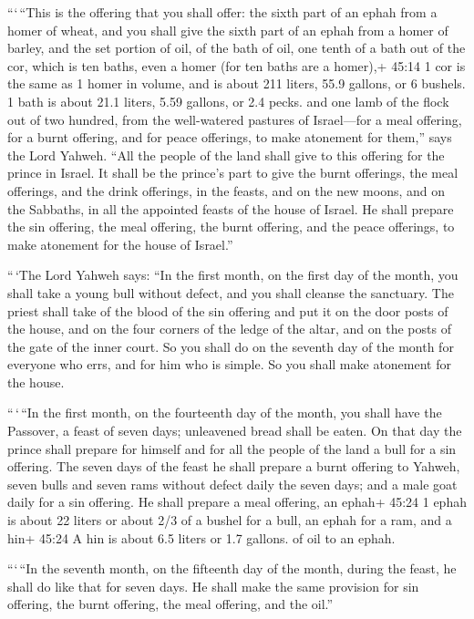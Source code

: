  ```\,``This is the offering that you shall offer: the
sixth part of an ephah from a homer of wheat, and you shall give the
sixth part of an ephah from a homer of barley,  and the set
portion of oil, of the bath of oil, one tenth of a bath out of the cor,
which is ten baths, even a homer (for ten baths are a homer),+ 45:14 1
cor is the same as 1 homer in volume, and is about 211 liters, 55.9
gallons, or 6 bushels. 1 bath is about 21.1 liters, 5.59 gallons, or 2.4
pecks.  and one lamb of the flock out of two hundred, from
the well-watered pastures of Israel---for a meal offering, for a burnt
offering, and for peace offerings, to make atonement for them,'' says
the Lord Yahweh.  ``All the people of the land shall give
to this offering for the prince in Israel.  It shall be the
prince's part to give the burnt offerings, the meal offerings, and the
drink offerings, in the feasts, and on the new moons, and on the
Sabbaths, in all the appointed feasts of the house of Israel. He shall
prepare the sin offering, the meal offering, the burnt offering, and the
peace offerings, to make atonement for the house of Israel.''

 ``\,`The Lord Yahweh says: ``In the first month, on the
first day of the month, you shall take a young bull without defect, and
you shall cleanse the sanctuary.  The priest shall take of
the blood of the sin offering and put it on the door posts of the house,
and on the four corners of the ledge of the altar, and on the posts of
the gate of the inner court.  So you shall do on the
seventh day of the month for everyone who errs, and for him who is
simple. So you shall make atonement for the house.

 ``\,`\,``In the first month, on the fourteenth day of the
month, you shall have the Passover, a feast of seven days; unleavened
bread shall be eaten.  On that day the prince shall prepare
for himself and for all the people of the land a bull for a sin
offering.  The seven days of the feast he shall prepare a
burnt offering to Yahweh, seven bulls and seven rams without defect
daily the seven days; and a male goat daily for a sin offering.
 He shall prepare a meal offering, an ephah+ 45:24 1 ephah
is about 22 liters or about 2/3 of a bushel for a bull, an ephah for a
ram, and a hin+ 45:24 A hin is about 6.5 liters or 1.7 gallons. of oil
to an ephah.

 ```\,``In the seventh month, on the fifteenth day of the
month, during the feast, he shall do like that for seven days. He shall
make the same provision for sin offering, the burnt offering, the meal
offering, and the oil.''

